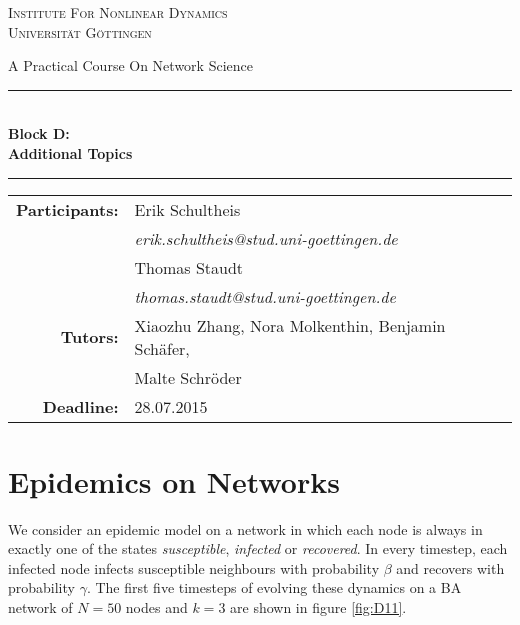 \documentclass{scrartcl}
\begin{document}
\begin{titlepage}\centering
\textsc{\Large Institute For Nonlinear Dynamics \\[1.5ex] Universität Göttingen}

\vspace*{2cm}
{\huge A Practical Course On Network Science}
\vspace*{2cm}

\rule{\textwidth}{1pt}\\[0.5cm]
{\bfseries \huge Block D: \\[0.5cm] \huge \bfseries Additional Topics\\[0.5cm]}
\rule{\textwidth}{1pt}

\vspace*{4cm}

\begin{Large}\begin{tabular}{rl}
        \textbf{Participants:}  & Erik Schultheis                                \\    
                   & \textit{erik.schultheis@stud.uni-goettingen.de}\\[0.5cm]
                   & Thomas Staudt                                  \\
                   & \textit{thomas.staudt@stud.uni-goettingen.de}  \\[1.0cm]

       \textbf{Tutors:}        & Xiaozhu Zhang, Nora Molkenthin, Benjamin Schäfer, \\
                               & Malte Schröder                                    \\[1.0cm]
       \textbf{Deadline:}      & 28.07.2015
\end{tabular}\end{Large}

\vspace*{1.5cm}


\end{titlepage}

\tableofcontents
\clearpage

\section{Epidemics on Networks}
\label{sec:eponnet}
We consider an epidemic model on a network in which each node is always in exactly one of the states \emph{susceptible}, \emph{infected} or \emph{recovered}. 
In every timestep, each infected node infects susceptible neighbours with probability $\beta$ and recovers with probability $\gamma$. 
The first five timesteps of evolving these dynamics on a BA network of $N=50$ nodes and $k=3$ are shown in figure \ref{fig:D11}.
\end{document}

